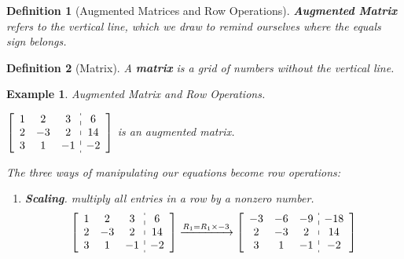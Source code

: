\documentclass[12pt, a4paper]{article}
\newtheorem{df}{Definition}[subsection]
\newtheorem{eg}{Example}[subsection]
\begin{document}
\begin{df}[Augmented Matrices and Row Operations]
\textbf{Augmented Matrix} refers to the vertical line, which we draw to remind ourselves where the equals sign belongs.
\end{df}

\begin{df}[Matrix]
A \textbf{matrix} is a grid of numbers without the vertical line. 
\end{df}

\begin{eg}
Augmented Matrix and Row Operations. \par
\begin{center}
$\left[\begin{array}{c:c}\begin{matrix}1&2&3\\2&-3&2\\3&1&-1\end{matrix}&\begin{matrix}6\\14\\-2\end{matrix}\end{array}\right]$ is an augmented matrix. 
\end{center}
The three ways of manipulating our equations become row operations:
\begin{enumerate}
\item \textbf{Scaling}. multiply all entries in a row by a nonzero number. 
$$\left[\begin{array}{c:c}\begin{matrix}1&2&3\\2&-3&2\\3&1&-1\end{matrix}&\begin{matrix}6\\14\\-2\end{matrix}\end{array}\right]\xrightarrow[]{R_1=R_1\times-3} \left[\begin{array}{c:c}\begin{matrix}-3&-6&-9\\2&-3&2\\3&1&-1\end{matrix}&\begin{matrix}-18\\14\\-2\end{matrix}\end{array}\right]$$

\end{enumerate}
\end{eg}
\end{document}
